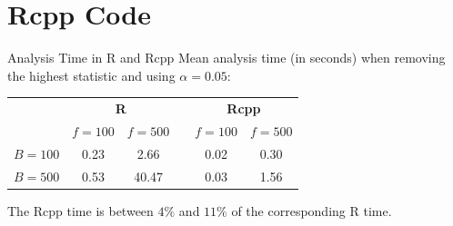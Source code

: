 \documentclass[aspectratio=169]{beamer}
\begin{document}


\section{Rcpp Code}
\begin{frame}{Analysis Time in R and Rcpp}
Mean analysis time (in seconds) when removing the highest statistic and using $\alpha=0.05$:
\begin{table}[h!]
\centering
\begin{tabular}{cccccc}
\toprule
 & \multicolumn{2}{c}{\textbf{R}} &  & \multicolumn{2}{c}{\textbf{Rcpp}} \\
\cline{2-3} \cline{5-6}
 & $f=100$ & $f=500$ &  & $f=100$ & $f=500$ \\
\midrule
$B=100$ & 0.23 & 2.66 &  & 0.02  & 0.30 \\
$B=500$ & 0.53 & 40.47 &  & 0.03 & 1.56 \\
\bottomrule
\end{tabular}
\end{table}
The Rcpp time is between $4\%$ and $11\%$ of the corresponding R time.
\end{frame}
\end{document}
